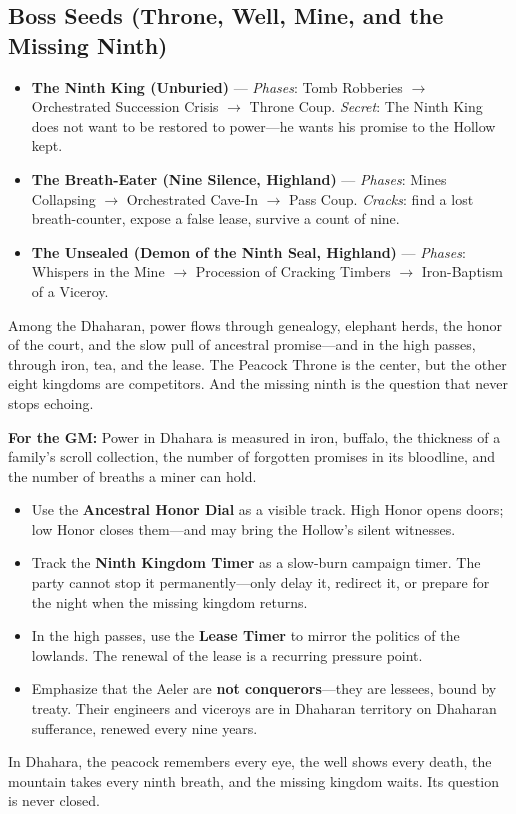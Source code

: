 \subsection*{Boss Seeds (Throne, Well, Mine, and the Missing Ninth)}
\begin{itemize}
\item \textbf{The Ninth King (Unburied)} --- \emph{Phases}: Tomb Robberies \(\rightarrow\) Orchestrated Succession Crisis \(\rightarrow\) Throne Coup. \emph{Secret}: The Ninth King does not want to be restored to power---he wants his promise to the Hollow kept.
\item \textbf{The Breath-Eater (Nine Silence, Highland)} --- \emph{Phases}: Mines Collapsing \(\rightarrow\) Orchestrated Cave-In \(\rightarrow\) Pass Coup. \emph{Cracks}: find a lost breath-counter, expose a false lease, survive a count of nine.
\item \textbf{The Unsealed (Demon of the Ninth Seal, Highland)} --- \emph{Phases}: Whispers in the Mine \(\rightarrow\) Procession of Cracking Timbers \(\rightarrow\) Iron-Baptism of a Viceroy.
\end{itemize}

\begin{tcolorbox}[colback=black!3,colframe=black!40!white,title={Patronage \& Power},breakable]
Among the Dhaharan, power flows through genealogy, elephant herds, the honor of the court, and the slow pull of ancestral promise---and in the high passes, through iron, tea, and the lease. The Peacock Throne is the center, but the other eight kingdoms are competitors. And the missing ninth is the question that never stops echoing.

\textbf{For the GM:}  
Power in Dhahara is measured in iron, buffalo, the thickness of a family's scroll collection, the number of forgotten promises in its bloodline, and the number of breaths a miner can hold.

\begin{itemize}
\item Use the \textbf{Ancestral Honor Dial} as a visible track. High Honor opens doors; low Honor closes them---and may bring the Hollow's silent witnesses.
\item Track the \textbf{Ninth Kingdom Timer } as a slow-burn campaign timer. The party cannot stop it permanently---only delay it, redirect it, or prepare for the night when the missing kingdom returns.
\item In the high passes, use the \textbf{Lease Timer } to mirror the politics of the lowlands. The renewal of the lease is a recurring pressure point.
\item Emphasize that the Aeler are \textbf{not conquerors}---they are lessees, bound by treaty. Their engineers and viceroys are in Dhaharan territory on Dhaharan sufferance, renewed every nine years.
\end{itemize}
In Dhahara, the peacock remembers every eye, the well shows every death, the mountain takes every ninth breath, and the missing kingdom waits. Its question is never closed.
\end{tcolorbox}

